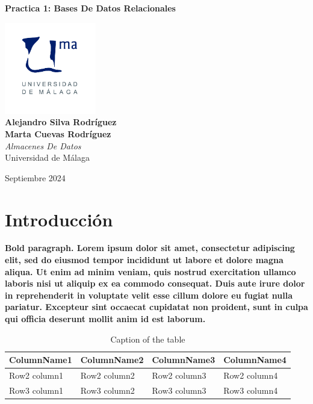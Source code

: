 \documentclass{article}
\begin{document}
\begin{titlepage}
	\centering
	\vspace*{3cm}
	
	{\Huge \textbf{Practica 1: Bases De Datos Relacionales}\\[0.5cm]}
	
	\vspace{2cm}
	\includegraphics[width=0.3\textwidth]{images/uma_logo.jpg}\\[1cm]
	
	{\LARGE \textbf{Alejandro Silva Rodríguez}\\[0.5cm]}
	{\LARGE \textbf{Marta Cuevas Rodríguez}\\[0.5cm]}
	{\large \textit{Almacenes De Datos}\\
		Universidad de Málaga\\
		}
	
	\vfill
	
	{\large Septiembre 2024}
\end{titlepage}

\tableofcontents

\newpage

\section{Introducción}

\textbf{Bold paragraph. Lorem ipsum dolor sit amet, consectetur adipiscing elit, sed do eiusmod tempor incididunt ut labore et dolore magna aliqua. Ut enim ad minim veniam, quis nostrud exercitation ullamco laboris nisi ut aliquip ex ea commodo consequat. Duis aute irure dolor in reprehenderit in voluptate velit esse cillum dolore eu fugiat nulla pariatur. Excepteur sint occaecat cupidatat non proident, sunt in culpa qui officia deserunt mollit anim id est laborum.}

\begin{table}
    \label{tab:example1}
 	\caption{Caption of the table}
	\centering
	\begin{tabular}{C|CCC}
 		\toprule
 		ColumnName1 & ColumnName2 & ColumnName3  & ColumnName4 \\
 		\midrule
 		Row2 column1 & Row2 column2 & Row2 column3 & Row2 column4 \\
   		Row3 column1 & Row3 column2 & Row3 column3 & Row3 column4 \\
 		\bottomrule
 	\end{tabular}
\end{table}
 
\end{document}
